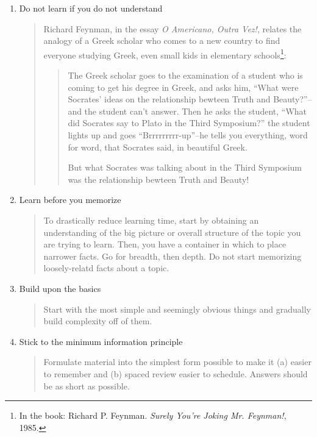 \documentclass[]{tufte-handout}
\begin{document}
\begin{enumerate}
\item{Do not learn if you do not understand}

\begin{quote}
Richard Feynman, in the essay \textit{O Americano, Outra Vez!}, relates the analogy of a Greek scholar who comes to a new country to find everyone studying Greek, even small kids in elementary schools\footnote{In the book: Richard P. Feynman. \textit{Surely You’re Joking Mr. Feynman!}, 1985.}:

\begin{quote}
The Greek scholar goes to the examination of a student who is coming to get his degree in Greek, and asks him, ``What were Socrates' ideas on the relationship bewteen Truth and Beauty?''--and the student can't answer. Then he asks the student, ``What did Socrates say to Plato in the Third Symposium?'' the student lights up and goes ``Brrrrrrrrr-up''--he tells you everything, word for word, that Socrates said, in beautiful Greek.

But what Socrates was talking about in the Third Symposium was the relationship bewteen Truth and Beauty!
\end{quote}
\end{quote}

\item{Learn before you memorize}
\begin{quote}
To drastically reduce learning time, start by obtaining an understanding of the big picture or overall structure of the topic you are trying to learn. Then, you have a container in which to place narrower facts. Go for breadth, then depth. Do not start memorizing loosely-relatd facts about a topic.
\end{quote}

\item{Build upon the basics}

\begin{quote}
Start with the most simple and seemingly obvious things and gradually build complexity off of them.
\end{quote}

\item{Stick to the minimum information principle}

\begin{quote}
Formulate material into the simplest form possible to make it (a) easier to remember and (b) spaced review easier to schedule. Answers should be as short as possible.


\end{quote}
\end{enumerate}
\end{document}
